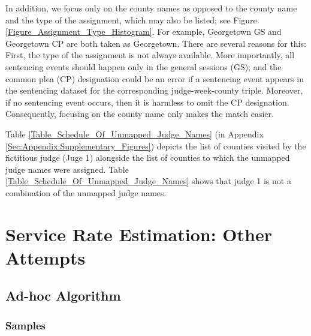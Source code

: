\documentclass[11pt, oneside]{article}   	%
\theoremstyle{ModifiedStyle}
\begin{document}
  	In addition, we focus only on the county names as opposed to the county name and the type of the assignment, which may also be listed; see Figure \ref{Figure_Assignment_Type_Histogram}. For example, Georgetown GS and Georgetown CP are both taken as Georgetown. There are several reasons for this: First, the type of the assignment is not always available. More importantly, all sentencing events should happen only in the general sessions (GS); and the common plea (CP) designation could be an error if a sentencing event appears in the sentencing dataset for the corresponding judge-week-county triple. Moreover, if no sentencing event occurs, then it is harmless to omit the CP designation. Consequently, focusing on the county name only makes the match easier.

  	Table \ref{Table_Schedule_Of_Unmapped_Judge_Names} (in Appendix \ref{Sec:Appendix:Supplementary_Figures}) depicts the list of counties visited by the fictitious judge (Juge 1) alongside the list of counties to which the unmapped judge names were assigned. Table \ref{Table_Schedule_Of_Unmapped_Judge_Names} shows that judge 1 is not a combination of the unmapped judge names.

\section{Service Rate Estimation: Other Attempts}

  \subsection{Ad-hoc Algorithm}
		\subsubsection{Samples}
\end{document}
